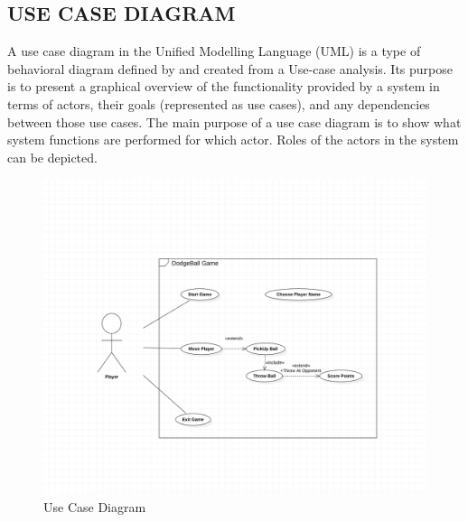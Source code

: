 \documentclass[12pt]{report}
\begin{document}
\subsection{USE CASE DIAGRAM}
A use case diagram in the Unified Modelling Language (UML) is a type of behavioral
diagram defined by and created from a Use-case analysis. Its purpose is to present a graphical 
overview of the functionality provided by a system in terms of actors, their goals 
(represented as use cases), and any dependencies between those use cases. The main purpose 
of a use case diagram is to show what system functions are performed for which actor. Roles 
of the actors in the system can be depicted.
\setlength{\parindent}{0em}
\setlength{\parskip}{0em}
\begin{figure}[h]
\centering
\includegraphics[scale=0.42]{Use case.png}
\caption{ Use Case Diagram}
\label{ Use Case Diagram}
\end{figure}

\clearpage
\end{document}
